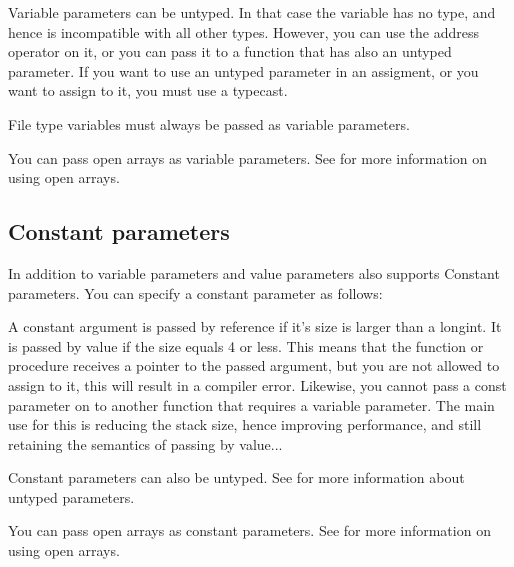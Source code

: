 \documentclass{report}
\begin{document}
Variable parameters can be untyped. In that case the variable has no type,
and hence is incompatible with all other types. However, you can use the
address operator on it, or you can pass it to a function that has also an
untyped parameter. If you want to use an untyped parameter in an assigment,
or you want to assign to it, you must use a typecast.

File type variables must always be passed as variable parameters.

You can pass open arrays as variable parameters. See  for
more information on using open arrays.
\subsection{Constant parameters}
In addition to variable parameters and value parameters \fpc also supports
Constant parameters. You can specify a constant parameter as follows:

A constant argument is passed by reference if it's size is larger than a
longint. It is passed by value if the size equals 4 or less.
This means that the function or procedure receives a pointer to the passed
argument, but you are not allowed to assign to it, this will result in a
compiler error. Likewise, you cannot pass a const parameter on to another
function that requires a variable parameter.
The main use for this is reducing the stack size, hence improving
performance, and still retaining the semantics of passing by value...

Constant parameters can also be untyped. See  for more
information about untyped parameters.

You can pass open arrays as constant parameters. See  for
more information on using open arrays.
\end{document}

